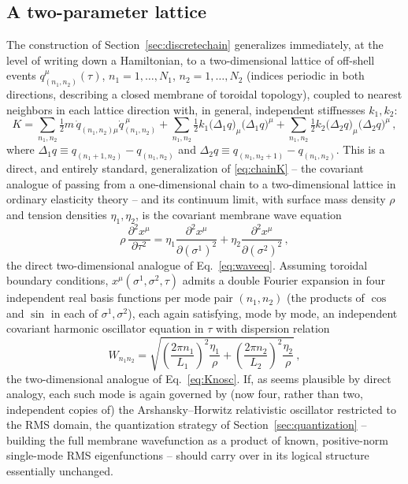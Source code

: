 \documentclass[11pt]{article}
\newcommand{\eqn}[1]{Eq.~\eqref{#1}}
\begin{document}
\subsection{A two-parameter lattice}

The construction of Section~\ref{sec:discretechain} generalizes immediately,
at the level of writing down a Hamiltonian, to a two-dimensional lattice of
off-shell events $q_{(n_1,n_2)}^\mu(\tau)$, $n_1=1,\dots,N_1$,
$n_2=1,\dots,N_2$ (indices periodic in both directions, describing a closed
membrane of toroidal topology), coupled to nearest neighbors in each lattice
direction with, in general, independent stiffnesses $k_1,k_2$:
\begin{equation}
K=\sum_{n_1,n_2}\tfrac12 m\,\dot q_{(n_1,n_2)\mu}\dot q_{(n_1,n_2)}^{\ \mu}
+\sum_{n_1,n_2}\tfrac12 k_1\big(\Delta_1 q\big)_\mu\big(\Delta_1 q\big)^\mu
+\sum_{n_1,n_2}\tfrac12 k_2\big(\Delta_2 q\big)_\mu\big(\Delta_2 q\big)^\mu\,,
\label{eq:membraneK}
\end{equation}
where $\Delta_1q\equiv q_{(n_1+1,n_2)}-q_{(n_1,n_2)}$ and
$\Delta_2q\equiv q_{(n_1,n_2+1)}-q_{(n_1,n_2)}$. This is a direct, and entirely
standard, generalization of \eqref{eq:chainK} -- the covariant analogue of
passing from a one-dimensional chain to a two-dimensional lattice in ordinary
elasticity theory -- and its continuum limit, with surface mass density $\rho$
and tension densities $\eta_1,\eta_2$, is the covariant membrane wave equation
\begin{equation}
\rho\,\frac{\partial^2 x^\mu}{\partial\tau^2}
=\eta_1\frac{\partial^2 x^\mu}{\partial(\sigma^1)^2}+\eta_2\frac{\partial^2 x^\mu}{\partial(\sigma^2)^2}\,,
\label{eq:membranewave}
\end{equation}
the direct two-dimensional analogue of \eqn{eq:waveeq}. Assuming toroidal
boundary conditions, $x^\mu(\sigma^1,\sigma^2,\tau)$ admits a double Fourier
expansion in four independent real basis functions per mode pair
$(n_1,n_2)$ (the products of $\cos$ and $\sin$ in each of $\sigma^1,\sigma^2$),
each again satisfying, mode by mode, an independent covariant harmonic
oscillator equation in $\tau$ with dispersion relation
\begin{equation}
W_{n_1n_2}=\sqrt{\left(\frac{2\pi n_1}{L_1}\right)^2\frac{\eta_1}{\rho}
+\left(\frac{2\pi n_2}{L_2}\right)^2\frac{\eta_2}{\rho}}\,,
\label{eq:membranedispersion}
\end{equation}
the two-dimensional analogue of \eqn{eq:Knosc}. If, as seems plausible by
direct analogy, each such mode is again governed by (now four, rather than
two, independent copies of) the Arshansky--Horwitz relativistic oscillator
restricted to the RMS domain, the quantization strategy of
Section~\ref{sec:quantization} -- building the full membrane wavefunction as a
product of known, positive-norm single-mode RMS eigenfunctions -- should carry
over in its logical structure essentially unchanged.
\end{document}
